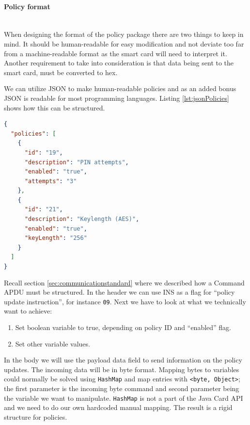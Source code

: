 \newpage

\paragraph{Policy format}\mbox{}\\
When designing the format of the policy package there are two things to keep in mind. It should be human-readable for easy modification and not deviate too far from a machine-readable format as the smart card will need to interpret it. Another requirement to take into consideration is that data being sent to the smart card, must be converted to hex.

We can utilize JSON to make human-readable policies and as an added bonus JSON is readable for most programming languages. Listing \ref{lst:jsonPolicies} shows how this can be structured.
\begin{lstlisting}[language=json,firstnumber=1,caption=Human-readable policies in JSON., label=lst:jsonPolicies,]
{
  "policies": [
    {
      "id": "19",
      "description": "PIN attempts",
      "enabled": "true",
      "attempts": "3"
    },
    {
      "id": "21",
      "description": "Keylength (AES)",
      "enabled": "true",
      "keyLength": "256"
    }
  ]
}
\end{lstlisting}

Recall section \ref{sec:communicationstandard} where we described how a Command APDU must be structured. In the header we can use INS as a flag for ``policy update instruction'', for instance \texttt{09}. Next we have to look at what we technically want to achieve:
\begin{enumerate}
    \item Set boolean variable to true, depending on policy ID and ``enabled'' flag.
    \item Set other variable values.
\end{enumerate}
In the body we will use the payload data field to send information on the policy updates. The incoming data will be in byte format. Mapping bytes to variables could normally be solved using \texttt{HashMap} and map entries with \texttt{<byte, Object>}; the first parameter is the incoming byte command and second parameter being the variable we want to manipulate. \texttt{HashMap} is not a part of the Java Card API and we need to do our own hardcoded manual mapping. The result is a rigid structure for policies.

